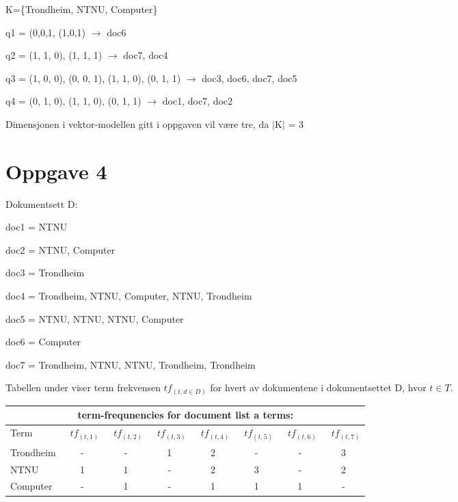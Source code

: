 \documentclass[]{article}
\begin{document}
\vspace{5mm}

K=\{Trondheim, NTNU, Computer\}

q1 = (0,0,1, (1,0,1) $\rightarrow$ doc6

q2 = (1, 1, 0), (1, 1, 1) $\rightarrow$ doc7, doc4

q3 = (1, 0, 0), (0, 0, 1), (1, 1, 0), (0, 1, 1) $\rightarrow$ doc3, doc6, doc7, doc5

q4 = (0, 1, 0), (1, 1, 0), (0, 1, 1) $\rightarrow$ doc1, doc7, doc2

\vspace{10mm}

Dimensjonen i vektor-modellen gitt i oppgaven vil være tre, da $\mid$K$\mid$ = 3


\pagebreak

\section{Oppgave 4}

Dokumentsett D:
\vspace{1mm}

doc1 = NTNU

doc2 = NTNU, Computer

doc3 = Trondheim

doc4 = Trondheim, NTNU, Computer, NTNU, Trondheim

doc5 = NTNU, NTNU, NTNU, Computer

doc6 = Computer

doc7 = Trondheim, NTNU, NTNU, Trondheim, Trondheim 
\vspace{5 mm}


Tabellen under viser term frekvensen $tf_{(t,d \in D)}$ for hvert av dokumentene i dokumentsettet D, hvor $t \in T$.
\vspace{5 mm}

\begin{center}
\begin{tabular}[t]{|l|ccccccc|}

\multicolumn{8}{c}{term-frequnencies for document list a terms:}\\\hline

Term&\ $tf_{(t,1)}$&\ $tf_{(t,2)}$&\ $tf_{(t,3)}$&\ $tf_{(t,4)}$&\ $tf_{(t,5)}$&\ $tf_{(t,6)}$&\ $tf_{(t,7)}$\\\hline

Trondheim&-&-&1&2&-&-&3\\

NTNU&1&1&-&2&3&-&2\\

Computer&-&1&-&1&1&1&-\\\hline
\end{tabular}
\end{center}
\vspace{10 mm}
\end{document}

